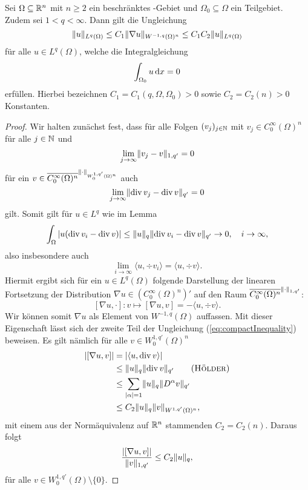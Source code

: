 \begin{lem}
  \label{lem:compactEmbedding}
  Sei $\Omega \subseteq \mathbb{R}^n$ mit $n \geq 2$ ein beschränktes \lipschitz\hyp{}Gebiet und $\Omega_0 \subseteq \Omega$ ein Teilgebiet.
  Zudem sei $1 < q < \infty$.
  Dann gilt die Ungleichung
  \begin{equation}
    \label{eq:compactInequality}
    \lVert u \rVert_{L^q(\Omega)} 
    \leq C_1 \lVert \nabla u \rVert_{W^{-1,q}(\Omega)^n}
    \leq C_1 C_2 \lVert u \rVert_{L^q(\Omega)}
  \end{equation}
  für alle $u \in L^q(\Omega)$, welche die Integralgleichung
  $$
  \int_{\Omega_0} u \, {\operatorname{d}\!{x}} = 0
  $$
  erfüllen.
  Hierbei bezeichnen $C_1 = C_1(q, \Omega, \Omega_0) > 0$ sowie $C_2 = C_2(n) > 0$ Konstanten.
\end{lem}

\begin{proof}
  Wir halten zunächst fest, dass für alle Folgen $(v_j)_{j \in \mathbb{N}}$ mit $v_j \in C_0^\infty(\Omega)^n$ für alle $j \in \mathbb{N}$ und 
  $$
  \lim_{j \to \infty} \lVert v_j - v \rVert_{1,q'} = 0
  $$ 
  für ein $v \in \overline{C_0^\infty(\Omega)^n}^{\lVert \cdot \rVert_{W_0^{1,q'}(\Omega)^n}}$ auch 
  $$
  \lim_{j \to \infty} \lVert \mathrm{div\,} v_j - \mathrm{div\,} v \rVert_{q'} = 0
  $$ 
  gilt.
  Somit gilt für $u \in L^q$ wie im Lemma
  $$
  \int_\Omega | u ( \mathrm{div\,} v_i - \mathrm{div\,} v) | \leq \lVert u \rVert_q \lVert \mathrm{div\,} v_i - \mathrm{div\,} v \rVert_{q'} \to 0, \quad i \to \infty,
  $$
  also insbesondere auch
  $$
  \lim_{i \to \infty} \langle u, \div v_i \rangle = \langle u, \div v \rangle.
  $$
  Hiermit ergibt sich für ein $u \in L^q(\Omega)$ folgende Darstellung der linearen Fortsetzung der Distribution $\nabla u \in (C_0^\infty(\Omega)^n)'$ auf den Raum $\overline{C_0^\infty(\Omega)^n}^{\lVert \cdot \rVert_{1,q'}}$:
  $$
    [\nabla u, \cdot] \colon v \mapsto [\nabla u, v] 
    = - \langle u, \div v \rangle.
  $$
  Wir können somit $\nabla u$ als Element von $W^{-1,q}(\Omega)$ auffassen.
  Mit dieser Eigenschaft lässt sich der zweite Teil der Ungleichung (\ref{eq:compactInequality}) beweisen. 
  Es gilt nämlich für alle $v \in W_0^{1,q'}(\Omega)^n$
  \begin{align*}
    |[\nabla u, v]|
    &= | \langle u, \div v \rangle| \\
    &\leq \norm{u}_q \norm{\div v}_{q'} \tag{\hoelder}\\
    &\leq \sum_{|\alpha| = 1} \norm{u}_q \norm{D^\alpha v}_{q'} \\
    &\leq C_2 \norm{u}_q \norm{v}_{W^{1,q'}(\Omega)^n},
  \end{align*}
  mit einem aus der Normäquivalenz auf $\mathbb{R}^n$ stammenden $C_2 = C_2(n)$.
  Daraus folgt
  $$
  \frac{|[\nabla u, v]|}{\lVert v \rVert_{1,q'}} \leq C_2 \lVert u \rVert_q,
  $$
  für alle $v \in W_0^{1,q'}(\Omega) \setminus\{0\}$.


\end{proof}
